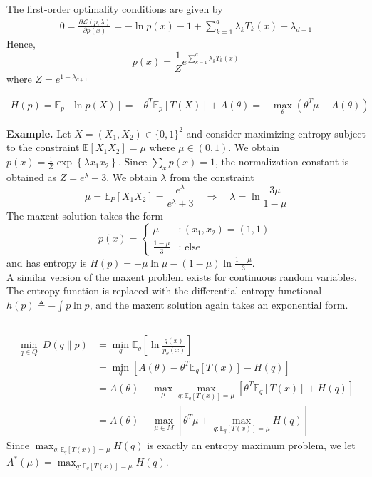 \documentclass[11pt,a4paper]{article}
\begin{document}
The first-order optimality conditions are given by
\begin{equation}
    \begin{aligned}
        0=\frac{\partial \mathcal{L}(p, \lambda)}{\partial p(x)}=-\ln p(x)-1+\sum_{k=1}^d\lambda_kT_k(x)+\lambda_{d+1}
    \end{aligned}
    \nonumber
\end{equation}
Hence, $$p(x)=\frac{1}{Z}e^{\sum_{k=1}^d\lambda_kT_k(x)}$$
where $Z=e^{1-\lambda_{d+1}}$

\begin{equation}
    \begin{aligned}
        H(p)=\mathbb{E}_p[\ln p(X)]=-\theta^T \mathbb{E}_p[T(X)]+A(\theta)=-\max_\theta(\theta^T \mu-A(\theta))
    \end{aligned}
    \nonumber
\end{equation}

\textbf{Example.} Let $X=\left(X_1, X_2\right) \in\{0,1\}^2$ and consider maximizing entropy subject to the constraint $\mathbb{E}\left[X_1 X_2\right]=\mu$ where $\mu \in(0,1)$. We obtain $p(x)=\frac{1}{Z} \exp \left\{\lambda x_1 x_2\right\}$. Since $\sum_x p(x)=1$, the normalization constant is obtained as $Z=e^\lambda+3$. We obtain $\lambda$ from the constraint
$$
\mu=\mathbb{E}_P\left[X_1 X_2\right]=\frac{e^\lambda}{e^\lambda+3} \quad \Rightarrow \quad \lambda=\ln \frac{3 \mu}{1-\mu}
$$
The maxent solution takes the form
$$
p(x)= \begin{cases}\mu & :\left(x_1, x_2\right)=(1,1) \\ \frac{1-\mu}{3} & : \text { else }\end{cases}
$$
and has entropy is $H(p)=-\mu \ln \mu-(1-\mu) \ln \frac{1-\mu}{3}$.\\
A similar version of the maxent problem exists for continuous random variables. The entropy function is replaced with the differential entropy functional $h(p) \triangleq-\int p \ln p$, and the maxent solution again takes an exponential form.


\subsection{}
\begin{equation}
    \begin{aligned}
        \min_{q\in Q}\ D(q\| p)&=\min_q \mathbb{E}_q\left[\ln\frac{q(x)}{p_\theta(x)}\right]\\
        &=\min_q \left[A(\theta)-\theta^T \mathbb{E}_q[T(x)]-H(q)\right]\\
        &=A(\theta)-\max_\mu \max_{q: \mathbb{E}_q[T(x)]=\mu}\left[\theta^T \mathbb{E}_q [T(x)]+H(q)\right]\\
        &=A(\theta)-\max_{\mu\in M}\left[\theta^T \mu +\max_{q: \mathbb{E}_q[T(x)]=\mu}H(q)\right]
    \end{aligned}
    \nonumber
\end{equation}
Since $\max_{q: \mathbb{E}_q[T(x)]=\mu}H(q)$ is exactly an entropy maximum problem, we let $A^*(\mu)=\max_{q: \mathbb{E}_q[T(x)]=\mu}H(q)$.
\end{document}
